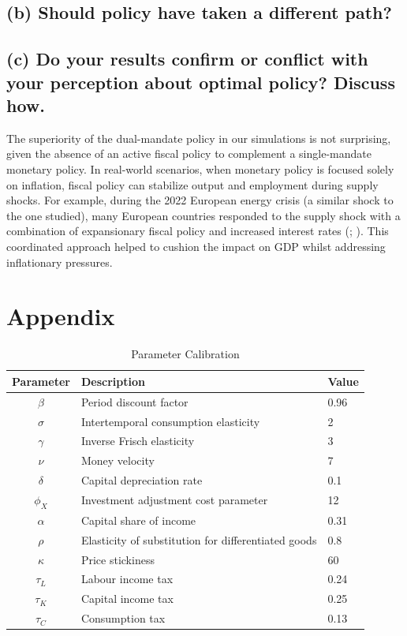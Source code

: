 \documentclass[12pt]{article}
\begin{document}
\subsection*{(b) Should policy have taken a different path?}

\subsection*{(c) Do your results confirm or conflict with your perception about optimal policy? Discuss how.}
The superiority of the dual-mandate policy in our simulations is not surprising, given the absence of an active fiscal policy to complement a single-mandate monetary policy. In real-world scenarios, when monetary policy is focused solely on inflation, fiscal policy can stabilize output and employment during supply shocks. For example, during the 2022 European energy crisis (a similar shock to the one studied), many European countries responded to the supply shock with a combination of expansionary fiscal policy and increased interest rates (\cite{bankoffinlandEuropeanCentralBanks2022}; \cite{checherita-westphalUpdateEuroArea2023}). This coordinated approach helped to cushion the impact on GDP whilst addressing inflationary pressures.
\newpage %
\printbibliography{} %

\newpage
\appendix
\section{Appendix}
\begin{table}[ht]
    \centering
    \caption{Parameter Calibration}\label{tab:parameters}
    \begin{tabular}{cll}
        \toprule
        Parameter & Description & Value  \\ \midrule
        $\beta$ & Period discount factor  & 0.96  \\
        $\sigma$ & Intertemporal consumption elasticity  & 2  \\
        $\gamma$ & Inverse Frisch elasticity  & 3  \\
        $\nu$ & Money velocity  & 7  \\
        $\delta$ & Capital depreciation rate  & 0.1  \\
        $\phi_X$ & Investment adjustment cost parameter & 12  \\
        $\alpha$ & Capital share of income & 0.31  \\
        $\rho$ & Elasticity of substitution for differentiated goods &  0.8  \\
        $\kappa$ & Price stickiness & 60 \\
        ${\tau_L}$ & Labour income tax & 0.24 \\
        ${\tau_K}$ & Capital income tax & 0.25 \\
        ${\tau_C}$ & Consumption tax & 0.13 \\
    \bottomrule
    \end{tabular}
\end{table}
\end{document}
